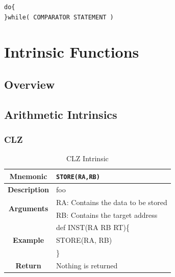 \documentclass{article}
\begin{document}
\vspace{0.125in}
\begin{lstlisting}[frame=single,style=base,caption={Do While Loop Syntax},captionpos=b,label={lis:dowhileloopsyntax}]
do{
}while( COMPARATOR STATEMENT )
\end{lstlisting}

\clearpage
\section{Intrinsic Functions}
\label{sec:IntrinsicFunctions}

\subsection{Overview}
\label{sec:IntrinsicOverview}

\subsection{Arithmetic Intrinsics}
\label{sec:ArithIntrinsics}

\subsubsection{CLZ}
\label{sec:CLZ}

\begin{table}[h]
\begin{center}
\caption{CLZ Intrinsic}
\vspace{0.125in}
\label{tab:CLZIntrinsic}
\begin{tabular}{|c|l|}
\hline
\textbf{Mnemonic} & \texttt{STORE(RA,RB)}\\
\hline
\textbf{Description} & foo\\
\hline
\multirow{2}{*}{\textbf{Arguments}} & RA: Contains the data to be stored\\
                          			     & RB: Contains the target address \\
\hline
\multirow{3}{*}{\textbf{Example}} & def INST(RA RB RT)\{\\
                          			  &   STORE(RA, RB)\\
                                                    & \}\\
\hline
\textbf{Return} & Nothing is returned\\                                                    
\hline
\end{tabular}
\end{center}
\end{table}
\end{document}
